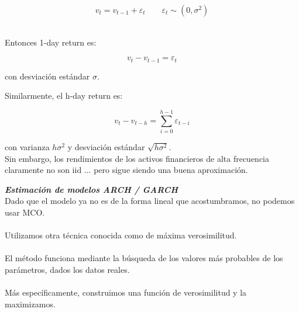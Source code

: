 	\begin{center}
		\begin{equation}
		v_{t}=v_{t-1}+\varepsilon_{t}\qquad\varepsilon_{t}\sim(0,\sigma^{2})
		\end{equation}
		$ $
		\par\end{center}
	
	Entonces 1-day return es: 
	
	\begin{center}
		\[
		v_{t}-v_{t-1}=\varepsilon_{t}
		\]
		
		\par\end{center}
	
	con desviaci\'on est\'andar $\sigma$. 

	
	Similarmente, el h-day return es: 
	
	\begin{center}
		\begin{equation}
		v_{t}-v_{t-h}=\sum_{i=0}^{h-1}\varepsilon_{t-i}
		\end{equation}
		
		\par\end{center}
	
	con varianza $h\sigma^{2}$ y desviaci\'on est\'andar $\sqrt{h\sigma^{2}}$.
	\\
	Sin embargo, los rendimientos de los activos financieros de alta frecuencia claramente no son iid ... pero sigue siendo una buena aproximaci\'on.
	


\textit{\textbf{Estimaci\'on de modelos ARCH / GARCH}}\\
	Dado que el modelo ya no es de la forma lineal que acostumbramos, no podemos usar MCO.\\
	\\
	Utilizamos otra t\'ecnica conocida como de m\'axima verosimilitud.\\
	\\
	El m\'etodo funciona mediante la b\'usqueda de los valores m\'as probables de los par\'ametros, dados los datos reales.\\
	\\
	M\'as específicamente, construimos una funci\'on de verosimilitud y la maximizamos. 
	
